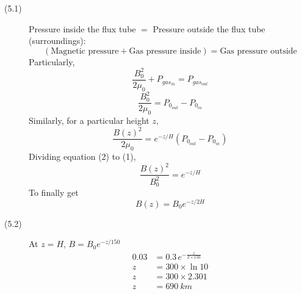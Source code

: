 \begin{description}
\item[(5.1)] Pressure inside the flux tube $=$ Pressure outside the flux tube
  (surroundings):
  \[
  (\text{Magnetic pressure} + \text{Gas pressure inside}) = \text{Gas pressure outside}
  \]
  Particularly,
  \begin{equation*}
  \frac{B_0^2}{2\mu_0} + P_{gas_{in}} = P_{gas_{out}} \tag*{[2 points]}
  \end{equation*}
  \begin{equation*}
  \frac{B_0^2}{2\mu_0} = P_{0_{out}} - P_{0_{in}} \tag*{Eq.~(1)}
  \end{equation*}
  Similarly, for a particular height $z$,
  \begin{equation*}
  \frac{B(z)^2}{2\mu_0} = e^{-z/H}\left(P_{0_{out}} - P_{0_{in}}\right) \tag*{Eq.~(2)\quad[2 points]}
  \end{equation*}
  Dividing equation (2) to (1),
  \[
  \frac{B(z)^2}{B_0^2} = e^{-z/H}
  \]
  To finally get
  \begin{equation*}
  B(z) = B_0 e^{-z/2H} \tag*{[3 points]}
  \end{equation*}
\item[(5.2)] At $z = H$, $B = B_0 e^{-z/150}$
  \begin{align*}
  0.03 &= 0.3\, e^{-\frac{z}{2\times150}}\\
  z &= 300 \times \ln 10\\
  z &= 300 \times 2.301\\
  z &= 690~km \tag*{[3 points]}
  \end{align*}
\end{description}
